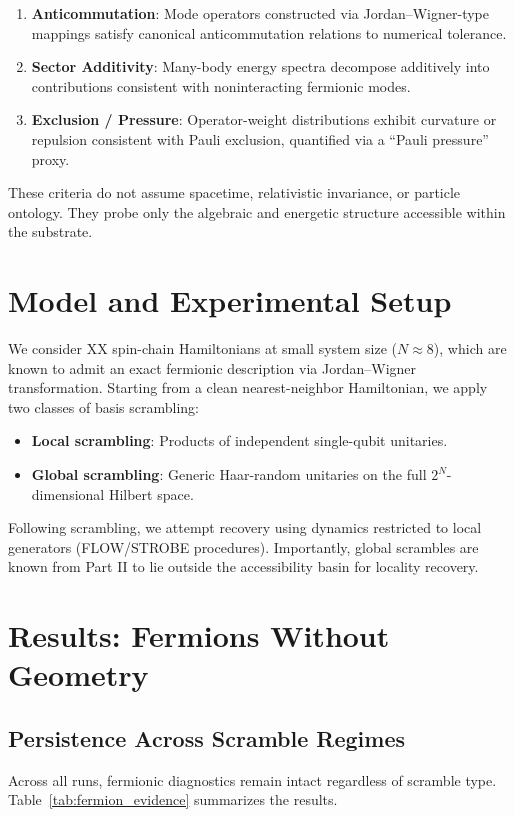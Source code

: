 \documentclass[11pt]{article}
\begin{document}
\begin{enumerate}
    \item \textbf{Anticommutation}: Mode operators constructed via Jordan--Wigner-type mappings satisfy canonical anticommutation relations to numerical tolerance.
    \item \textbf{Sector Additivity}: Many-body energy spectra decompose additively into contributions consistent with noninteracting fermionic modes.
    \item \textbf{Exclusion / Pressure}: Operator-weight distributions exhibit curvature or repulsion consistent with Pauli exclusion, quantified via a ``Pauli pressure'' proxy.
\end{enumerate}

These criteria do not assume spacetime, relativistic invariance, or particle ontology. They probe only the algebraic and energetic structure accessible within the substrate.

\section{Model and Experimental Setup}
We consider XX spin-chain Hamiltonians at small system size ($N \approx 8$), which are known to admit an exact fermionic description via Jordan--Wigner transformation. Starting from a clean nearest-neighbor Hamiltonian, we apply two classes of basis scrambling:

\begin{itemize}
    \item \textbf{Local scrambling}: Products of independent single-qubit unitaries.
    \item \textbf{Global scrambling}: Generic Haar-random unitaries on the full $2^N$-dimensional Hilbert space.
\end{itemize}

Following scrambling, we attempt recovery using dynamics restricted to local generators (FLOW/STROBE procedures). Importantly, global scrambles are known from Part II to lie outside the accessibility basin for locality recovery.

\section{Results: Fermions Without Geometry}
\subsection{Persistence Across Scramble Regimes}
Across all runs, fermionic diagnostics remain intact regardless of scramble type. Table~\ref{tab:fermion_evidence} summarizes the results.
\end{document}

